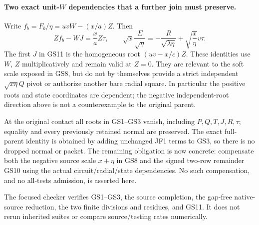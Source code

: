 \paragraph{Two exact unit-$W$ dependencies that a further join must preserve.}
Write $f_b=F_b/\eta=uvW-(x/a)Z$. Then
\[
 Zf_b-WJ=\frac{x}{a}Z\tau,
 \qquad
 \sqrt{x}\frac E{\sqrt\eta}
       =-\frac{R}{\sqrt{\lambda\eta}}
                  +\sqrt{\frac{x}{\eta}}v\tau.      \tag{GS11}
\]
The first $J$ in GS11 is the homogeneous root $(uv-x/c)Z$.
These identities use $W$, $Z$ multiplicatively and remain valid at
$Z=0$. They are relevant to the soft scale exposed in GS8, but do
not by themselves provide a strict independent $\sqrt{x\eta}Q$
pivot or authorize another bare radial square. In particular the
positive roots and state coordinates are dependent; the negative
independent-root direction above is not a counterexample to the
original parent.

At the original contact all roots in GS1--GS3 vanish, including
$P,Q,T,J,R,\tau$; equality and every previously retained normal are
preserved. The exact full-parent identity is obtained by adding
unchanged JF1 terms to GS3, so there is no dropped normal or packet.
The remaining obligation is now concrete: compensate both the
negative source scale $x+\eta$ in GS8 and the signed two-row
remainder GS10 using the actual circuit/radial/state dependencies.
No such compensation, and no all-tests admission, is asserted here.

The focused checker  verifies
GS1--GS3, the source completion, the gap-free native-source reduction,
the two finite divisions and residues, and GS11. It does not rerun
inherited suites or compare source/testing rates numerically.
